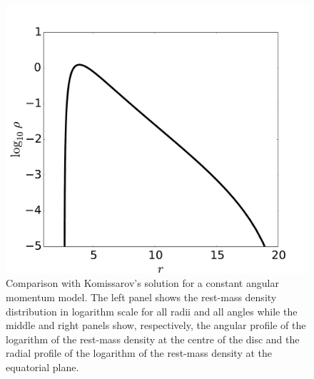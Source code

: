 \documentclass[referee]{aa}
\begin{document}
\begin{figure}[t]
\includegraphics[scale=0.14]{figures/fig1c.pdf}
\caption{Comparison with Komissarov's solution for a constant angular momentum model. The left panel shows the rest-mass density distribution in logarithm scale for all radii and all angles while the middle and right panels show, respectively, the angular profile of the logarithm of the rest-mass density at the centre of the disc and the radial profile of the logarithm of the rest-mass density at the equatorial plane.}
\label{komissarov}
\end{figure}
\end{document}
